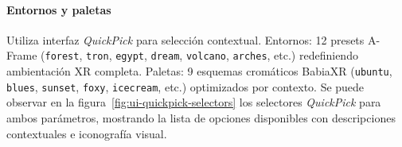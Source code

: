 \documentclass[a4paper, 12pt]{book}
\begin{document}
\paragraph{Entornos y paletas}
Utiliza interfaz \emph{QuickPick} para selección contextual. Entornos: 12 presets A-Frame (\texttt{forest}, \texttt{tron}, \texttt{egypt}, \texttt{dream}, \texttt{volcano}, \texttt{arches}, etc.) redefiniendo ambientación XR completa. Paletas: 9 esquemas cromáticos BabiaXR (\texttt{ubuntu}, \texttt{blues}, \texttt{sunset}, \texttt{foxy}, \texttt{icecream}, etc.) optimizados por contexto. Se puede observar en la figura~\ref{fig:ui-quickpick-selectors} los selectores \emph{QuickPick} para ambos parámetros, mostrando la lista de opciones disponibles con descripciones contextuales e iconografía visual.

\end{document}
